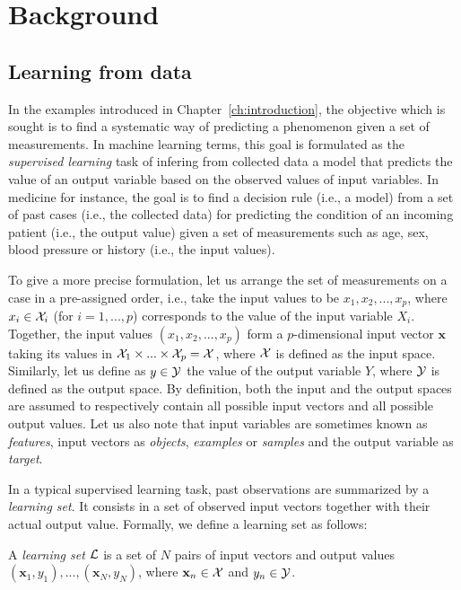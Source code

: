 \chapter{Background}\label{ch:background}

\section{Learning from data}

In the examples introduced in Chapter~\ref{ch:introduction}, the objective
which is sought is to find a systematic way of predicting a phenomenon given a
set of measurements. In machine learning terms, this goal is formulated as the
{\it supervised learning} task of infering from collected data a model that
predicts the value of an output variable based on the observed values of input
variables. In medicine for instance, the goal is to find a decision rule (i.e.,
a model) from a set of past cases (i.e., the collected data) for predicting the
condition of an incoming patient (i.e., the output value) given a set of
measurements such as age, sex, blood pressure or history (i.e., the input
values).

To give a more precise formulation, let us arrange the set of measurements on a
case in a pre-assigned order, i.e., take the input values to be $x_1, x_2, ...,
x_p$, where $x_i \in {\cal X}_i$ (for $i = 1, ..., p$) corresponds to the value
of the input variable $X_i$. Together, the input values $(x_1, x_2, ..., x_p)$
form a $p$-dimensional input vector $\mathbf{x}$ taking its values in ${\cal
X}_1 \times ... \times {\cal X}_p = {\cal X}$, where ${\cal X}$ is defined as
the input space. Similarly, let us define as $y \in {\cal Y}$ the value of the
output variable $Y$, where ${\cal Y}$ is defined as the output space. By
definition, both the input and the output spaces are assumed to respectively
contain all possible input vectors and all possible output values. Let
us also note that input variables are sometimes known as {\it features}, input
vectors as {\it objects}, {\it examples} or {\it samples} and the output
variable as {\it target}.

In a typical supervised learning task, past observations are summarized by a
{\it learning set}. It consists in a set of observed input vectors together
with their actual output value. Formally, we define a learning set as follows:

\begin{definition}
A \emph{learning set} ${\cal L}$ is a set of $N$
pairs of input vectors and output values $(\mathbf{x}_1, y_1), ...,
(\mathbf{x}_N, y_N)$, where $\mathbf{x}_n \in {\cal X}$ and $y_n \in {\cal Y}$.
\end{definition}

